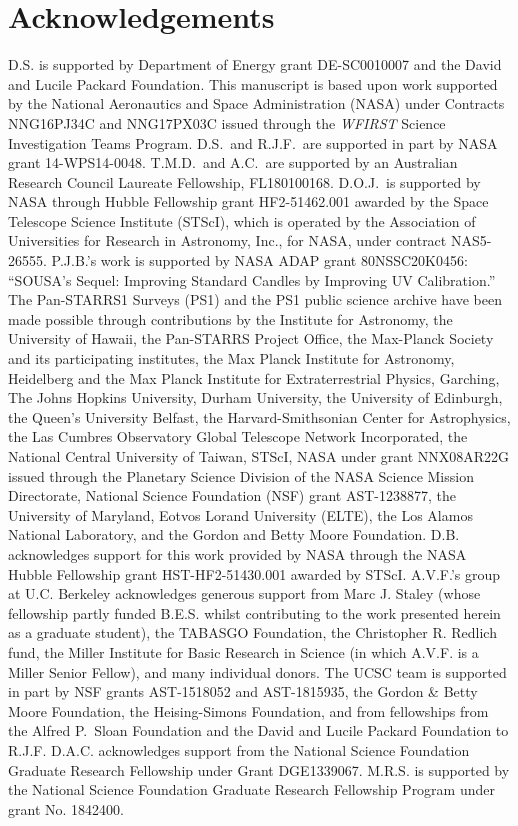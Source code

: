 \documentclass[twocolumn]{aastex63}
\begin{document}


\section{Acknowledgements}
 D.S. is supported by Department of Energy grant DE-SC0010007 and the David and Lucile Packard Foundation. This manuscript is based upon work supported by the National Aeronautics and Space Administration (NASA) under Contracts NNG16PJ34C and NNG17PX03C issued through the {\it WFIRST} Science Investigation Teams Program.  
%
D.S.\ and R.J.F.\ are supported in part by NASA grant 14-WPS14-0048.
%
T.M.D.\ and A.C.\ are supported by an Australian Research Council Laureate Fellowship, FL180100168.  D.O.J.\ is supported by NASA through Hubble Fellowship grant HF2-51462.001 awarded by the Space Telescope Science Institute (STScI), which is operated by the Association of Universities for Research in Astronomy, Inc., for NASA, under contract NAS5-26555. P.J.B.'s work is supported by NASA ADAP grant 80NSSC20K0456:  ``SOUSA's Sequel: Improving Standard Candles by Improving UV Calibration.''  The Pan-STARRS1 Surveys (PS1) and the PS1 public science archive have been made possible through contributions by the Institute for Astronomy, the University of Hawaii, the Pan-STARRS Project Office, the Max-Planck Society and its participating institutes, the Max Planck Institute for Astronomy, Heidelberg and the Max Planck Institute for Extraterrestrial Physics, Garching, The Johns Hopkins University, Durham University, the University of Edinburgh, the Queen's University Belfast, the Harvard-Smithsonian Center for Astrophysics, the Las Cumbres Observatory Global Telescope Network Incorporated, the National Central University of Taiwan, STScI, NASA under grant NNX08AR22G issued through the Planetary Science Division of the NASA Science Mission Directorate, National Science Foundation (NSF) grant AST-1238877, the University of Maryland, Eotvos Lorand University (ELTE), the Los Alamos National Laboratory, and the Gordon and Betty Moore Foundation. D.B. acknowledges support for this work provided by NASA through the NASA Hubble Fellowship grant HST-HF2-51430.001 awarded by STScI. 
A.V.F.'s group at U.C. Berkeley acknowledges generous support from Marc J. Staley (whose fellowship partly funded B.E.S. whilst contributing to the work presented herein as a graduate student), the TABASGO Foundation, the Christopher R. Redlich fund, the Miller Institute for Basic Research in Science (in which A.V.F. is a Miller Senior Fellow), and many individual donors. 
The UCSC team is supported in part by NSF grants AST-1518052 and AST-1815935, the Gordon \& Betty Moore Foundation, the Heising-Simons Foundation, and from fellowships from the Alfred P.\ Sloan Foundation and the David and Lucile Packard Foundation to R.J.F. D.A.C. acknowledges support from the National Science Foundation Graduate Research Fellowship under Grant DGE1339067. M.R.S. is supported by the National Science Foundation Graduate Research Fellowship Program under grant No. 1842400.
\end{document}
